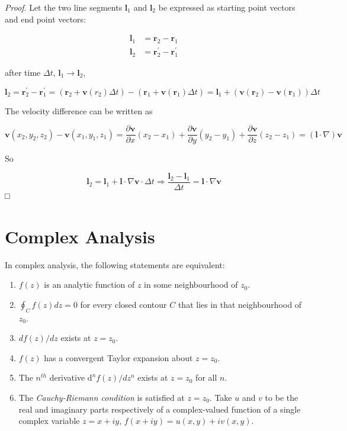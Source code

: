 \documentclass[
  notoc %
]{tufte-book}
\providecommand{\tightlist}{%
  \setlength{\itemsep}{0pt}\setlength{\parskip}{0pt}
}
\begin{document}
\emph{Proof}. Let the two line segments \(\mathbf{l}_1\) and
\(\mathbf{l}_2\) be expressed as starting point vectors and end point
vectors:

\[
\begin{aligned}
\mathbf{l}_1&=\mathbf{r}_2 -\mathbf{r}_1 \\
\mathbf{l}_2&=\mathbf{r}_2^\prime -\mathbf{r}_1^\prime
\end{aligned}
\]

after time \(\Delta t\), \(\mathbf{l}_1\rightarrow \mathbf{l}_2\),

\[
\mathbf{l}_2=\mathbf{r}_2^\prime -\mathbf{r}_1^\prime=(\mathbf{r}_2 +\mathbf{v}(r_2)\Delta t)-(\mathbf{r}_1+\mathbf{v}(\mathbf{r}_1)\Delta t)=\mathbf{l}_1+(\mathbf{v}(\mathbf{r}_2)-\mathbf{v}(\mathbf{r}_1))\Delta t
\]

The velocity difference can be written as

\[
\mathbf{v}(x_2,y_2,z_2)-\mathbf{v}(x_1,y_1,z_1) = \frac{\partial\mathbf{v}}{\partial x}(x_2-x_1) +\frac{\partial\mathbf{v}}{\partial y}(y_2-y_1) +\frac{\partial\mathbf{v}}{\partial z}(z_2-z_1) =(\mathbf{l}\cdot\nabla)\mathbf{v}
\]

So

\[
\mathbf{l}_2=\mathbf{l}_1+\mathbf{l}\cdot\nabla\mathbf{v}\cdot\Delta t\Rightarrow \frac{\mathbf{l}_2-\mathbf{l}_1}{\Delta t}=\mathbf{l}\cdot\nabla\mathbf{v}
\] □

\hypertarget{complex-analysis}{%
\section{Complex Analysis}\label{complex-analysis}}

In complex analysis, the following statements are equivalent:

\begin{enumerate}
\def\labelenumi{\arabic{enumi}.}
\tightlist
\item
  \(f(z)\) is an analytic function of \(z\) in some neighbourhood of
  \(z_0\).
\item
  \(\oint_C f(z)dz=0\) for every closed contour \(C\) that lies in that
  neighbourhood of \(z_0\).
\item
  \(df(z)/dz\) exists at \(z=z_0\).
\item
  \(f(z)\) has a convergent Taylor expansion about \(z=z_0\).
\item
  The \(n^{th}\) derivative \(\mathrm{d}^nf(z)/dz^n\) exists at
  \(z=z_0\) for all \(n\).
\item
  The \emph{Cauchy-Riemann condition} is satisfied at \(z=z_0\). Take
  \(u\) and \(v\) to be the real and imaginary parts respectively of a
  complex-valued function of a single complex variable \(z = x + iy\),
  \(f(x + iy) = u(x,y) + iv(x,y)\).
\end{enumerate}
\end{document}

